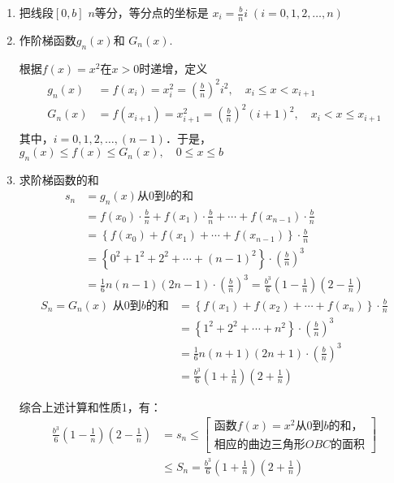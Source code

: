 \begin{solution}
\begin{enumerate}
    \item 把线段$[0,b]$ $n$等分，等分点的坐标是
   $ x_i=\frac{b}{n}i\;  (i=0, 1, 2,\ldots,n)$ 
   \item 作阶梯函数$g_n(x)$和
    $G_n (x)$.

    根据$f(x)=x^2$在$x>0$时递增，定义
\begin{align*}
g_n(x)&=f(x_i)=x^2_i=\left(\frac{b}{n}\right)^2i^2,\quad x_i\le x<x_{i+1}\\
G_n(x)&=f(x_{i+1})=x^2_{i+1}=\left(\frac{b}{n}\right)^2(i+1)^2,\quad x_i<x\le x_{i+1}\\
\end{align*}
其中，$i=0,1,2,\ldots,(n-1)$．于是，$g_n(x)\le f(x)\le G_n(x),\quad 0\le x\le b$

\item 求阶梯函数的和
\begin{align*}
s_n&=g_n(x)\text{从0到$b$的和}\\
&=f\left(x_{0}\right) \cdot \frac{b}{n}+f\left(x_{1}\right) \cdot \frac{b}{n}+\cdots+f\left(x_{n-1}\right) \cdot \frac{b}{n}\\
&=\left\{f\left(x_{0}\right)+f\left(x_{1}\right)+\cdots+f\left(x_{n-1}\right)\right\} \cdot \frac{b}{n} \\
&=\left\{0^{2}+1^{2}+2^{2}+\cdots+(n-1)^{2}\right\} \cdot\left(\frac{b}{n}\right)^3\\
&=\frac{1}{6}n(n-1)(2 n-1) \cdot\left(\frac{b}{n}\right)^{3} =\frac{b^3}{6}\left(1-\frac{1}{n}\right)\left(2-\frac{1}{n}\right) 
\end{align*}
\begin{align*}
   S_{n}= G_{n}(x) \text { 从0到$b$的和}
   &= \left\{f\left(x_{1}\right)+f\left(x_{2}\right)+\cdots+f\left(x_{n}\right)\right\} \cdot \frac{b}{n} \\
   &=\left\{1^2+2^{2}+\cdots+n^{2}\right\} \cdot\left(\frac{b}{n}\right)^{3} \\
   &=\frac{1}{6}n(n+1)(2 n+1) \cdot\left(\frac{b}{n}\right)^{3} \\
   &=\frac{b^3}{6}\left(1+\frac{1}{n}\right)\left(2+\frac{1}{n}\right) 
\end{align*}

综合上述计算和性质1，有：
\begin{align*}
\frac{b^3}{6}\left(1-\frac{1}{n}\right)\left(2-\frac{1}{n}\right)&=s_n\le \begin{bmatrix}
\text{函数$f(x)=x^2$从0到$b$的和，}\\
\text{相应的曲边三角形$OBC$的面积}
\end{bmatrix}\\
&\le S_n=\frac{b^3}{6}\left(1+\frac{1}{n}\right)\left(2+\frac{1}{n}\right)
\end{align*}


\end{enumerate}
\end{solution}
